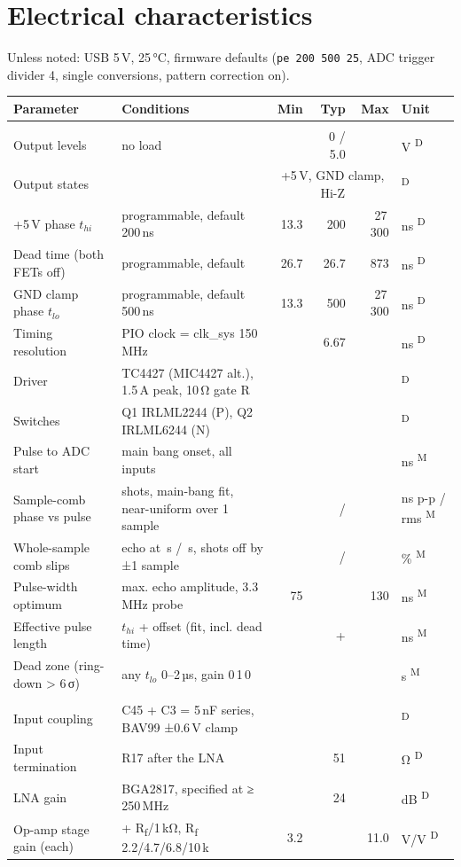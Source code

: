 \documentclass[10pt,a4paper]{article}
\makeatletter
\newcommand{\us}{\,\textmu s}
\newcommand{\cmd}[1]{\texttt{#1}}
\newcommand{\meas}{\textsuperscript{M}}
\newcommand{\des}{\textsuperscript{D}}
\newenvironment{spec}[1]{%
  \small\begin{longtable}{@{}>{\raggedright\arraybackslash}p{50mm}>{\raggedright\arraybackslash}p{55mm}rrrl@{}}
  \toprule\textbf{Parameter} & \textbf{Conditions} & \textbf{Min} & \textbf{Typ} & \textbf{Max} & \textbf{Unit}\\\midrule\endhead
  \multicolumn{6}{@{}l}{\color{accent}\bfseries #1}\\}{\bottomrule\end{longtable}}
\newcommand{\grp}[1]{\multicolumn{6}{@{}l}{\color{accent}\bfseries #1}\\}
\makeatother
\begin{document}
\section{Electrical characteristics}
Unless noted: USB 5\,V, 25\,°C, firmware defaults (\cmd{pe 200 500 25}, ADC trigger divider 4, single conversions, pattern correction on).
\begin{spec}{Transmit (pulser)}
Output levels & no load & & 0 / 5.0 & & V \des\\
Output states & & \multicolumn{3}{c}{+5\,V, GND clamp, Hi-Z} & \des\\
+5\,V phase $t_{hi}$ & programmable, default 200\,ns & 13.3 & 200 & 27\,300 & ns \des\\
Dead time (both FETs off) & programmable, default & 26.7 & 26.7 & 873 & ns \des\\
GND clamp phase $t_{lo}$ & programmable, default 500\,ns & 13.3 & 500 & 27\,300 & ns \des\\
Timing resolution & PIO clock = clk\_sys 150\,MHz & & 6.67 & & ns \des\\
Driver & TC4427 (MIC4427 alt.), 1.5\,A peak, 10\,Ω gate R & & & & \des\\
Switches & Q1 IRLML2244 (P), Q2 IRLML6244 (N) & & & & \des\\
Pulse to ADC start & main bang onset, all inputs & & \vonsetns & & ns \meas\\
Sample-comb phase vs pulse & \vEshots{} shots, main-bang fit, near-uniform over 1 sample & & \vEphispan{} / \vEphirms & & ns p-p / rms \meas\\
Whole-sample comb slips & echo at \vEsliptime\us{} / \vEsliptimeb\us{}, shots off by ±1 sample & & \vEslipa{} / \vEslipb & & \% \meas\\
Pulse-width optimum & max. echo amplitude, 3.3\,MHz probe & 75 & \vhibest & 130 & ns \meas\\
Effective pulse length & $t_{hi}$ + offset (fit, incl. dead time) & & +\vdeltaeff & & ns \meas\\
Dead zone (ring-down > 6\,σ) & any $t_{lo}$ 0–2\,µs, gain 0\,1\,0 & & \vdeadzone & & \textmu s \meas\\
\grp{Receive chain}
Input coupling & C45 + C3 = 5\,nF series, BAV99 ±0.6\,V clamp & & & & \des\\
Input termination & R17 after the LNA & & 51 & & Ω \des\\
LNA gain & BGA2817, specified at ≥ 250\,MHz & & 24 & & dB \des\\
Op-amp stage gain (each) & 1 + R\textsubscript{f}/1\,kΩ, R\textsubscript{f} 2.2/4.7/6.8/10\,k & 3.2 & & 11.0 & V/V \des\\

\end{spec}
\end{document}

